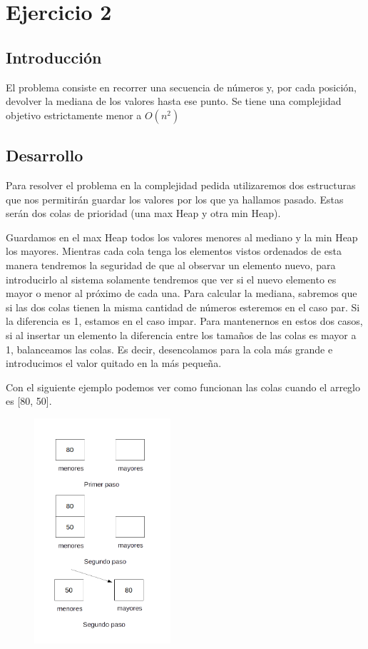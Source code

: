 
\section{Ejercicio 2}
\subsection{Introducción}
El problema consiste en recorrer una secuencia de n\'umeros y, por cada posición, devolver la mediana de los valores hasta ese punto. Se tiene una complejidad objetivo estrictamente menor a $O(n^2)$


\subsection{Desarrollo}

Para resolver el problema en la complejidad pedida utilizaremos dos estructuras que nos permitir\'an guardar los valores por los que ya hallamos pasado. Estas ser\'an dos colas de prioridad (una max Heap y otra min Heap).

Guardamos en el max Heap todos los valores menores al mediano y la min Heap los  mayores. Mientras cada cola tenga los elementos vistos ordenados de esta manera tendremos la seguridad de que al observar un elemento nuevo, para introducirlo al sistema solamente tendremos que ver si el nuevo elemento es mayor o menor al próximo de cada una.
Para calcular la mediana, sabremos que si las dos colas tienen la misma cantidad de números esteremos en el caso par. Si la diferencia es 1, estamos en el caso impar.
Para mantenernos en estos dos casos, si al insertar un elemento la diferencia entre los tamaños de las colas es mayor a 1, balanceamos las colas. Es decir, desencolamos para la cola más grande e introducimos el valor quitado en la más pequeña. 


Con el siguiente ejemplo podemos ver como funcionan las colas cuando el arreglo es [80, 50].

\begin{figure}[H]
  \centering
    \includegraphics[width=0.45\textwidth]{imagenes/ej2-ejemplo.png}
\end{figure}

